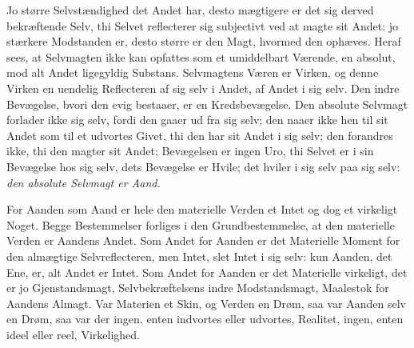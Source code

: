 \documentclass[12pt,a4paper]{book}
\begin{document}
Jo større Selvstændighed det Andet har, desto mægtigere er det sig
derved bekræftende Selv, thi Selvet reflecterer sig subjectivt ved at
magte sit Andet: jo stærkere Modstanden er, desto større er den Magt,
hvormed den ophæves. Heraf sees, at Selvmagten ikke kan opfattes som et
umiddelbart Værende, en absolut, mod alt Andet ligegyldig Substans.
Selvmagtens Væren er Virken, og denne Virken en uendelig Reflecteren af
sig selv i Andet, af Andet i sig selv. Den indre Bevægelse, bvori den
evig bestaaer, er en Kredsbevægelse. Den absolute Selvmagt forlader ikke
sig selv, fordi den gaaer ud fra sig selv; den naaer ikke hen
til sit Andet som til et udvortes Givet, thi den har sit Andet i sig
selv; den forandres ikke, thi den magter sit Andet; Bevægelsen er ingen
Uro, thi Selvet er i sin Bevægelse hos sig selv, dets Bevægelse er
Hvile; det hviler i sig selv paa sig selv: \emph{den absolute Selvmagt
er Aand.}

For Aanden som Aand er hele den materielle Verden et Intet og dog et
virkeligt Noget. Begge Bestemmelser forliges i den Grundbestemmelse, at
den materielle Verden er Aandens Andet. Som Andet for Aanden er det
Materielle Moment for den almægtige Selvreflecteren, men Intet, slet
Intet i sig selv: kun Aanden, det Ene, er, alt Andet er Intet. Som
Andet for Aanden er det Materielle virkeligt, det er jo
Gjenstandsmagt, Selvbekræftelsens indre Modstandsmagt, Maalestok for
Aandens Almagt. Var Materien et Skin, og Verden en Drøm, saa var Aanden
selv en Drøm, saa var der ingen, enten indvortes eller udvortes,
Realitet, ingen, enten ideel eller reel, Virkelighed.
\end{document}
